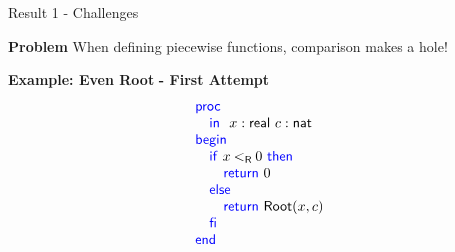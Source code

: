 \begin{frame}{Result 1 - Challenges}
    \begin{minipage}[t]{0.4\linewidth}
        \vspace{-2em}
        \begin{exampleblock}{\color{BrickRed}\textbf{Problem}}
            When defining piecewise functions, comparison makes a hole! 
        \end{exampleblock}
        \pause
        \vspace{0.75em}
        {\textbf{\color{MidnightBlue}Example: Even Root} \pause \textbf{\color{BrickRed} - First Attempt}\\}
        \footnotesize
        \vspace{-1em}
        \[ 
            \BLOCK{
            \PROC  \\
                \INDENT{
                \IN\ x:\real\ c:\nat}\\
            \BEGIN \\
                \INDENT{
                \IF x \realLess 0 \THEN \\
                    \INDENT{
                    \RETURN 0}\\
                \ELSE \\
                    \INDENT{
                    \RETURN \mathsf{Root}(x,c)}\\
                \FI \\

                }\\
            \END}\\
        \] 
        \pause
        \begin{flushright}
            \vspace{-3em}
            \pause
            
        \end{flushright}
    \end{minipage}
    \begin{minipage}[t]{0.50\linewidth}
      
              
    \end{minipage}

\end{frame}


